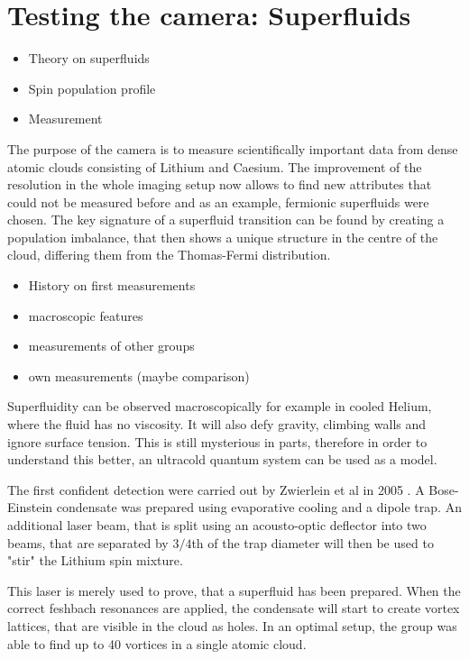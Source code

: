 \chapter{Testing the camera: Superfluids}
\begin{itemize}
	\item Theory on superfluids
	\item Spin population profile
	\item Measurement
\end{itemize}
The purpose of the camera is to measure scientifically important data from dense atomic clouds consisting of Lithium and Caesium.
The improvement of the resolution in the whole imaging setup now allows to find new attributes that could not be measured before and as an example, fermionic superfluids were chosen. The key signature of a superfluid transition can be found by creating a population imbalance, that then shows a unique structure in the centre of the cloud, differing them from the Thomas-Fermi distribution. 

\begin{itemize}
	\item History on first measurements
	\item macroscopic features
	\item measurements of other groups
	\item own measurements (maybe comparison)
\end{itemize}

Superfluidity can be observed macroscopically for example in cooled Helium, where the fluid has no viscosity. It will also defy gravity, climbing walls and ignore surface tension. This is still mysterious in parts, therefore in order to understand this better, an ultracold quantum system can be used as a model.

The first confident detection were carried out by Zwierlein et al in 2005 . A Bose-Einstein condensate was prepared using evaporative cooling and a dipole trap. An additional laser beam, that is split using an acousto-optic deflector into two beams, that are separated by $3/4$th of the trap diameter will then be used to "stir" the Lithium spin mixture.

This laser is merely used to prove, that a superfluid has been prepared. When the correct feshbach resonances are applied, the condensate will start to create vortex lattices, that are visible in the cloud as holes. In an optimal setup, the group was able to find up to 40 vortices in a single atomic cloud.

